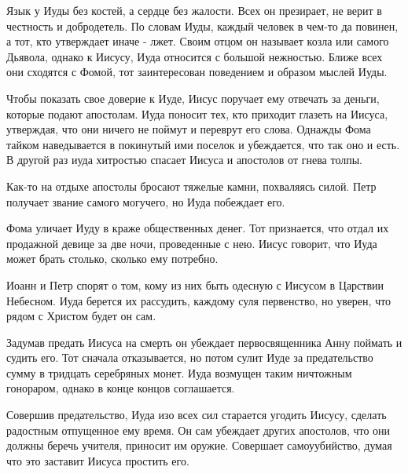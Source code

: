 \documentclass[a4paper,12pt]{article}
\begin{document}
	Язык у Иуды без костей, а сердце без жалости. Всех он презирает, не верит в честность и добродетель. По словам Иуды, каждый человек в чем-то да повинен, а тот, кто утверждает иначе - лжет. Своим отцом он называет козла или самого Дьявола, однако к Иисусу, Иуда относится с большой нежностью. Ближе всех они сходятся с Фомой, тот заинтересован поведением и образом мыслей Иуды.
	
	Чтобы показать свое доверие к Иуде, Иисус поручает ему отвечать за деньги, которые подают апостолам. Иуда поносит тех, кто приходит глазеть на Иисуса, утверждая, что они ничего не поймут и переврут его слова. Однажды Фома тайком наведывается в покинутый ими поселок и убеждается, что так оно и есть. В другой раз иуда хитростью спасает Иисуса и апостолов от гнева толпы.
	
	Как-то на отдыхе апостолы бросают тяжелые камни, похваляясь силой. Петр получает звание самого могучего, но Иуда побеждает его.
	
	Фома уличает Иуду в краже общественных денег. Тот признается, что отдал их продажной девице за две ночи, проведенные с нею. Иисус говорит, что Иуда может брать столько, сколько ему потребно.
	
	Иоанн и Петр спорят о том, кому из них быть одесную с Иисусом в Царствии Небесном. Иуда берется их рассудить, каждому суля первенство, но уверен, что рядом с Христом будет он сам.
	
	Задумав предать Иисуса на смерть он убеждает первосвященника Анну поймать и судить его. Тот сначала отказывается, но потом сулит Иуде за предательство сумму в тридцать серебряных монет. Иуда возмущен таким ничтожным гонораром, однако в конце концов соглашается.
	
	Совершив предательство, Иуда изо всех сил старается угодить Иисусу, сделать радостным отпущенное ему время. Он сам убеждает других апостолов, что они должны беречь учителя, приносит им оружие. Совершает самоуубийство, думая что это заставит Иисуса простить его.
	
	
\end{document}
